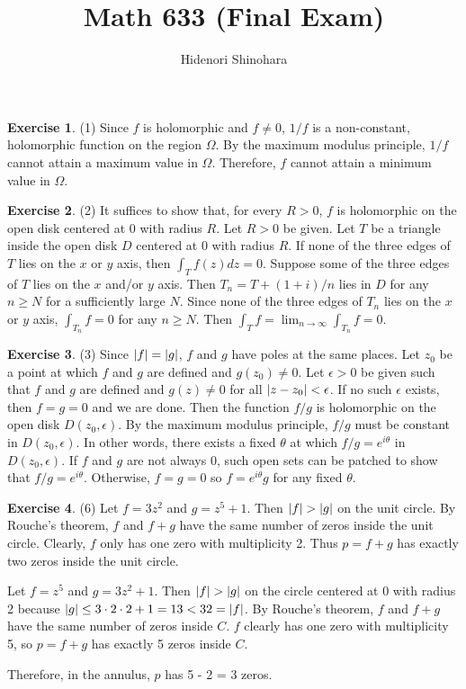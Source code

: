 \documentclass[12pt, psamsfonts]{amsart}
\theoremstyle{definition}
\newtheorem*{exer}{Exercise}
\theoremstyle{remark}
\numberwithin{equation}{section}
\begin{document}
\title{Math 633 (Final Exam)}
\author{Hidenori Shinohara}
\maketitle

\begin{exer}{(1)}
  Since $f$ is holomorphic and $f \ne 0$, $1 / f$ is a non-constant, holomorphic function on the region $\Omega$.
  By the maximum modulus principle, $1 / f$ cannot attain a maximum value in $\Omega$.
  Therefore, $f$ cannot attain a minimum value in $\Omega$.
\end{exer}

\begin{exer}{(2)}
  It suffices to show that, for every $R > 0$, $f$ is holomorphic on the open disk centered at 0 with radius $R$.
  Let $R > 0$ be given.
  Let $T$ be a triangle inside the open disk $D$ centered at 0 with radius $R$.
  If none of the three edges of $T$ lies on the $x$ or $y$ axis, then $\int_{T} f(z) dz = 0$.
  Suppose some of the three edges of $T$ lies on the $x$ and/or $y$ axis.
  Then $T_n = T + (1 + i) / n$ lies in $D$ for any $n \geq N$ for a sufficiently large $N$.
  Since none of the three edges of $T_n$ lies on the $x$ or $y$ axis, $\int_{T_n} f = 0$ for any $n \geq N$.
  Then $\int_{T} f = \lim_{n \rightarrow \infty} \int_{T_n} f = 0$.
\end{exer}

\begin{exer}{(3)}
  Since $\abs{f} = \abs{g}$, $f$ and $g$ have poles at the same places.
  Let $z_0$ be a point at which $f$ and $g$ are defined and $g(z_0) \ne 0$.
  Let $\epsilon > 0$ be given such that $f$ and $g$ are defined and $g(z) \ne 0$ for all $\abs{z - z_0} < \epsilon$.
  If no such $\epsilon$ exists, then $f = g = 0$ and we are done.
  Then the function $f / g$ is holomorphic on the open disk $D(z_0, \epsilon)$.
  By the maximum modulus principle, $f / g$ must be constant in $D(z_0, \epsilon)$.
  In other words, there exists a fixed $\theta$ at which $f / g = e^{i\theta}$ in $D(z_0, \epsilon)$.
  If $f$ and $g$ are not always 0, such open sets can be patched to show that $f / g = e^{i\theta}$.
  Otherwise, $f = g = 0$ so $f = e^{i\theta}g$ for any fixed $\theta$.
\end{exer}

\begin{exer}{(6)}
  Let $f = 3z^2$ and $g = z^5 + 1$.
  Then $\abs{f} > \abs{g}$ on the unit circle.
  By Rouche's theorem, $f$ and $f + g$ have the same number of zeros inside the unit circle.
  Clearly, $f$ only has one zero with multiplicity 2.
  Thus $p = f + g$ has exactly two zeros inside the unit circle.

  Let $f = z^5$ and $g = 3z^2 + 1$.
  Then $\abs{f} > \abs{g}$ on the circle centered at 0 with radius 2 because $\abs{g} \leq 3 \cdot 2 \cdot 2 + 1 = 13 < 32 = \abs{f}$.
  By Rouche's theorem, $f$ and $f + g$ have the same number of zeros inside $C$.
  $f$ clearly has one zero with multiplicity 5, so $p = f + g$ has exactly 5 zeros inside $C$.

  Therefore, in the annulus, $p$ has 5 - 2 = 3 zeros.
\end{exer}
\end{document}
